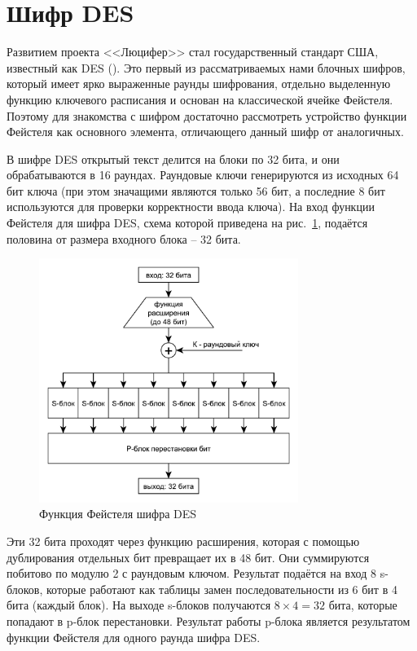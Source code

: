 \section{Шифр DES}

Развитием проекта <<Люцифер>> стал государственный стандарт США, известный как DES (). Это первый из рассматриваемых нами блочных шифров, который имеет ярко выраженные раунды шифрования, отдельно выделенную функцию ключевого расписания и основан на классической ячейке Фейстеля. Поэтому для знакомства с шифром достаточно рассмотреть устройство функции Фейстеля как основного элемента, отличающего данный шифр от аналогичных.

В шифре DES открытый текст делится на блоки по 32 бита, и они обрабатываются в 16 раундах. Раундовые ключи генерируются из исходных 64 бит ключа (при этом значащими являются только 56 бит, а последние 8 бит используются для проверки корректности ввода ключа). На вход функции Фейстеля для шифра DES, схема которой приведена на рис.~\ref{fig:des}, подаётся половина от размера входного блока -- 32 бита.

\begin{figure}[!htb]
    \centering
    \includegraphics[width=0.75\textwidth]{pic/des}
    \caption{Функция Фейстеля шифра DES\label{fig:des}}
\end{figure}

Эти 32 бита проходят через функцию расширения, которая с помощью дублирования отдельных бит превращает их в 48 бит. Они суммируются побитово по модулю 2 с раундовым ключом. Результат подаётся на вход 8 s-блоков, которые работают как таблицы замен последовательности из 6 бит в 4 бита (каждый блок). На выходе s-блоков получаются $8 \times 4 = 32$ бита, которые попадают в p-блок перестановки. Результат работы p-блока является результатом функции Фейстеля для одного раунда шифра DES.

